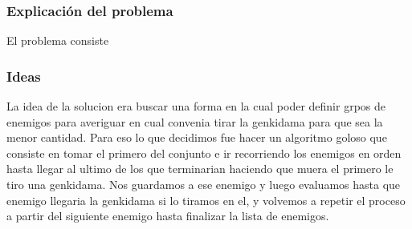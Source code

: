 \subsubsection{Explicación del problema}
El problema consiste 
\subsubsection{Ideas}
La idea de la solucion era buscar una forma en la cual poder definir grpos de enemigos para averiguar en cual convenia tirar la genkidama para que sea la menor cantidad.
Para eso lo que decidimos fue hacer un algoritmo goloso que consiste en tomar el primero del conjunto e ir recorriendo los enemigos en orden hasta llegar al ultimo de los que terminarian haciendo que muera el primero le tiro una genkidama. Nos guardamos a ese enemigo y luego evaluamos hasta que enemigo llegaria la genkidama si lo tiramos en el, y volvemos a repetir el proceso a partir del siguiente enemigo hasta finalizar la lista de enemigos.